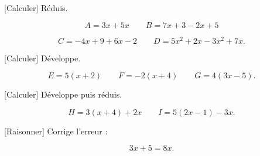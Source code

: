 \documentclass[12pt,a4paper]{article}
\begin{document}

[Calculer]
Réduis. 

\[
A=3x+5x
\qquad
B=7x+3-2x+5
\]

\[
C=-4x+9+6x-2
\qquad
D=5x^2+2x-3x^2+7x.
\]


[Calculer]
Développe. 

\[
E=5(x+2)
\qquad
F=-2(x+4)
\qquad
G=4(3x-5).
\]


[Calculer]
Développe puis réduis. 

\[
H=3(x+4)+2x
\qquad
I=5(2x-1)-3x.
\]


[Raisonner]
Corrige l'erreur : 

\[
3x+5=8x.
\]

\end{document}
